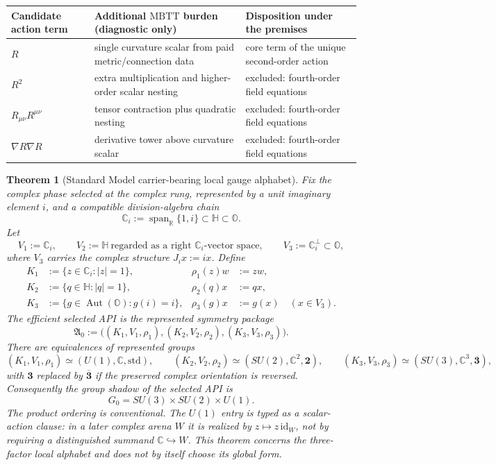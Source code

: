 \documentclass[11pt]{article}
\theoremstyle{plain}
\newtheorem{theorem}{Theorem}[section]
\theoremstyle{definition}
\theoremstyle{remark}
\newcommand{\MBTT}{\mathrm{MBTT}}
\newcommand{\Aut}{\operatorname{Aut}}
\newcommand{\R}{\mathbb{R}}
\newcommand{\C}{\mathbb{C}}
\newcommand{\HH}{\mathbb{H}}
\newcommand{\OO}{\mathbb{O}}
\begin{document}
\begin{center}
\small
\begin{tabularx}{\textwidth}{l Y Y}
\toprule
Candidate action term & Additional \(\MBTT\) burden (diagnostic only) & Disposition under the premises \\
\midrule
\(R\) & single curvature scalar from paid metric/connection data & core term of the unique second-order action \\
\(R^2\) & extra multiplication and higher-order scalar nesting & excluded: fourth-order field equations \\
\(R_{\mu\nu}R^{\mu\nu}\) & tensor contraction plus quadratic nesting & excluded: fourth-order field equations \\
\(\nabla R\nabla R\) & derivative tower above curvature scalar & excluded: fourth-order field equations \\
\bottomrule
\end{tabularx}
\end{center}

\begin{theorem}[Standard Model carrier-bearing local gauge alphabet]
Fix the complex phase selected at the complex rung, represented by a unit
imaginary element \(i\), and a compatible division-algebra chain
\[
\C_i:=\operatorname{span}_{\R}\{1,i\}\subset\HH\subset\OO.
\]
Let
\[
V_1:=\C_i,
\qquad
V_2:=\HH\ \text{regarded as a right }\C_i\text{-vector space},
\qquad
V_3:=\C_i^\perp\subset\OO,
\]
where \(V_3\) carries the complex structure \(J_i x:=ix\).  Define
\[
\begin{aligned}
K_1&:=\{z\in\C_i:|z|=1\},
&\rho_1(z)w&:=zw,\\
K_2&:=\{q\in\HH:|q|=1\},
&\rho_2(q)x&:=qx,\\
K_3&:=\{g\in\Aut(\OO):g(i)=i\},
&\rho_3(g)x&:=g(x)\quad(x\in V_3).
\end{aligned}
\]
The efficient selected API is the represented symmetry package
\[
\mathfrak A_0
:=
\bigl((K_1,V_1,\rho_1),(K_2,V_2,\rho_2),(K_3,V_3,\rho_3)\bigr).
\]
There are equivalences of represented groups
\[
(K_1,V_1,\rho_1)\simeq(U(1),\C,\mathrm{std}),
\qquad
(K_2,V_2,\rho_2)\simeq(SU(2),\C^2,\mathbf{2}),
\qquad
(K_3,V_3,\rho_3)\simeq(SU(3),\C^3,\mathbf{3}),
\]
with \(\mathbf{3}\) replaced by \(\overline{\mathbf{3}}\) if the preserved
complex orientation is reversed.  Consequently the group shadow of the
selected API is
\[
G_0=SU(3)\times SU(2)\times U(1).
\]
The product ordering is conventional.  The \(U(1)\) entry is typed as a
scalar-action clause: in a later complex arena \(W\) it is realized by
\(z\mapsto z\,\mathrm{id}_W\), not by requiring a distinguished summand
\(\C\hookrightarrow W\).  This theorem concerns the three-factor local
alphabet and does not by itself choose its global form.
\end{theorem}
\end{document}
